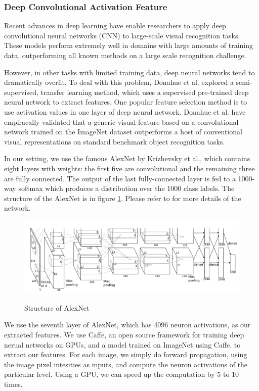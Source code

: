 \documentclass{article}
\begin{document}
\subsubsection{Deep Convolutional Activation Feature}
Recent advances in deep learning have enable researchers to apply deep convolutional neural networks (CNN) to large-scale visual recognition tasks. These models perform extremely well in domains with large amounts of training data, outperforming all known methods on a large scale recognition challenge.\par
However, in other tasks with limited training data, deep neural networks tend to dramatically overfit. To deal with this problem, Donahue et al.\cite{donahue2013decaf} explored a semi-supervised, transfer learning method, which uses a supervised pre-trained deep neural network to extract features. One popular feature selection method is to use activation values in one layer of deep neural network. Donahue et al. have empiracally validated that a generic visual feature based on a convolutional network trained on the ImageNet dataset outperforms a host of conventional visual representations on standard benchmark object recognition tasks.\par
In our setting, we use the famous AlexNet by Krizhevsky et al.\cite{krizhevsky2012imagenet}, which contains eight layers with weights: the first five are convolutional and the remaining three are fully connected. The output of the last fully-connected layer is fed to a 1000-way softmax which produces a distribution over the 1000 class labels. The structure of the AlexNet is in figure \ref{fig:alexnet}. Please refer to \cite{krizhevsky2012imagenet} for more details of the network. \par

\begin{figure}
\includegraphics[width=1.0\textwidth]{img/alexnet.png}
\label{fig:alexnet}
\caption{Structure of AlexNet}
\end{figure}

We use the seventh layer of AlexNet, which has 4096 neuron activations, as our extracted features. We use Caffe\cite{jia2014caffe}, an open source framework for training deep nerual networks on GPUs, and a model trained on ImageNet using Caffe, to extract our features. For each image, we simply do forward propagation, using the image pixel intesities as inputs, and compute the neuron activations of the particular level. Using a GPU, we can speed up the computation by 5 to 10 times.
\end{document}
